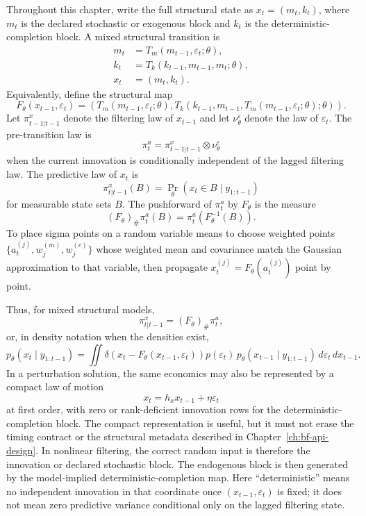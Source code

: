 \begin{definition}
\label{def:bf-structural-transition-notation}
Throughout this chapter, write the full structural state as
$x_t=(m_t,k_t)$, where $m_t$ is the declared stochastic or exogenous block and
$k_t$ is the deterministic-completion block.  A mixed structural transition is
\begin{align}
  m_t &= T_m(m_{t-1}, \varepsilon_t; \theta), \label{eq:bf-m-transition}\\
  k_t &= T_k(k_{t-1}, m_{t-1}, m_t; \theta), \label{eq:bf-k-transition}\\
  x_t &= (m_t, k_t).
\end{align}
Equivalently, define the structural map
\begin{equation}
  F_\theta(x_{t-1},\varepsilon_t)
  =
  \left(
    T_m(m_{t-1},\varepsilon_t;\theta),
    T_k(k_{t-1},m_{t-1},
      T_m(m_{t-1},\varepsilon_t;\theta);\theta)
  \right).
  \label{eq:bf-structural-map-definition}
\end{equation}
Let $\pi_{t-1|t-1}^x$ denote the filtering law of $x_{t-1}$ and let
$\nu_\theta^\varepsilon$ denote the law of $\varepsilon_t$.  The pre-transition
law is
\[
  \pi_t^a = \pi_{t-1|t-1}^x \otimes \nu_\theta^\varepsilon
\]
when the current innovation is conditionally independent of the lagged
filtering law.  The predictive law of $x_t$ is
\[
  \pi_{t|t-1}^x(B)
  =
  \Pr_\theta(x_t\in B\mid y_{1:t-1})
\]
for measurable state sets $B$.  The pushforward of $\pi_t^a$ by $F_\theta$ is
the measure
\[
  (F_\theta)_\#\pi_t^a(B)
  =
  \pi_t^a\!\left(F_\theta^{-1}(B)\right).
\]
To place sigma points on a random variable means to choose weighted points
$\{a_t^{(j)},w_j^{(m)},w_j^{(c)}\}$ whose weighted mean and covariance match
the Gaussian approximation to that variable, then propagate
$x_t^{(j)}=F_\theta(a_t^{(j)})$ point by point.
\end{definition}

Thus, for mixed structural models,
\[
  \pi_{t|t-1}^x = (F_\theta)_\#\pi_t^a,
\]
or, in density notation when the densities exist,
\[
  p_\theta(x_t\mid y_{1:t-1})
  =
  \iint \delta\!\left(x_t - F_\theta(x_{t-1},\varepsilon_t)\right)
  p(\varepsilon_t)\,p_\theta(x_{t-1}\mid y_{1:t-1})
  \, d\varepsilon_t \, dx_{t-1}.
\]
In a perturbation solution, the same economics may also be represented by a
compact law of motion
\[
  x_t = h_x x_{t-1} + \eta \varepsilon_t
\]
at first order, with zero or rank-deficient innovation rows for the
deterministic-completion block.  The compact representation is useful, but it
must not erase the timing contract or the structural metadata described in
Chapter~\ref{ch:bf-api-design}.
In nonlinear filtering, the correct random input is therefore the innovation or
declared stochastic block.  The endogenous block is then generated by the
model-implied deterministic-completion map.  Here ``deterministic'' means no
independent innovation in that coordinate once $(x_{t-1},\varepsilon_t)$ is
fixed; it does not mean zero predictive variance conditional only on the lagged
filtering state.

